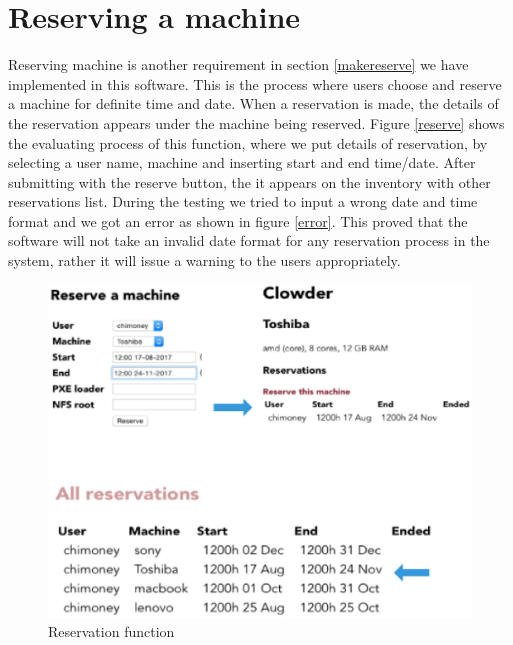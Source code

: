 \pagebreak
\section*{Reserving a machine}
Reserving machine is another requirement in section \ref{makereserve} we have implemented in this software. This is the process where users choose and reserve a machine for definite time and date. When a reservation is made, the details of the reservation appears under the machine being reserved. Figure \autoref{reserve} shows the evaluating process of this function, where we put details of reservation, by selecting a user name, machine and inserting start and end time/date. After submitting with the reserve button, the it appears on the inventory with other reservations list. During the testing we tried to input a wrong date and time format and we got an error as shown in figure \autoref{error}. This proved that the software will not take an invalid date format for any reservation process in the system, rather it will issue a warning to the users appropriately.
\begin{figure}[h]
  \includegraphics[width=\linewidth]{reserve.eps}
  \caption{Reservation function}
  \label{reserve}
\end{figure}

